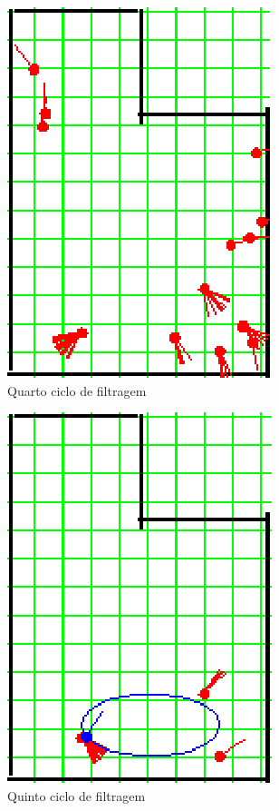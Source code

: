 \begin{figure}[H]
  \centering
  \includegraphics[scale=1]{figuras/cen4_ex3/5.eps}
  \caption[Quarto Ciclo de Filtragem]{Quarto ciclo de filtragem}
  \label{img:cen4_ex3_5}
\end{figure}

\begin{figure}[H]
  \centering
  \includegraphics[scale=1]{figuras/cen4_ex3/6.eps}
  \caption[Quinto Ciclo de Filtragem]{Quinto ciclo de filtragem}
  \label{img:cen4_ex3_6}
\end{figure}

